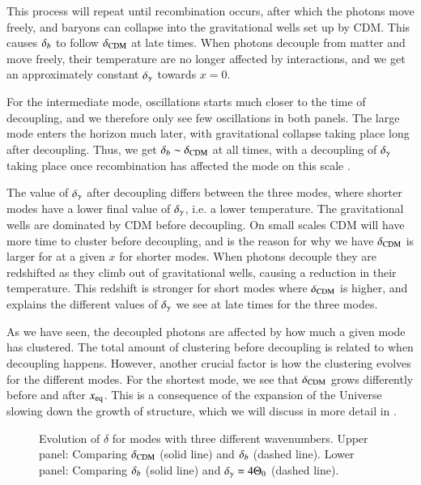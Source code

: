 This process will repeat until recombination occurs, after which the photons move freely, and baryons can collapse into the gravitational wells set up by CDM. This causes $\delta_b$ to follow $\delta_\mathrm{CDM}$ at late times. When photons decouple from matter and move freely, their temperature are no longer affected by interactions, and we get an approximately constant $\delta_\gamma$ towards $x=0$.  

For the intermediate mode, oscillations starts much closer to the time of decoupling, and we therefore only see few oscillations in both panels. The large mode enters the horizon much later, with gravitational collapse taking place long after decoupling. Thus, we get $\delta_b\sim\delta_\mathrm{CDM}$ at all times, with a decoupling of $\delta_\gamma$ taking place once recombination has affected the mode on this scale . 

The value of $\delta_\gamma$ after decoupling differs between the three modes, where shorter modes have a lower final value of $\delta_\gamma$, i.e. a lower temperature. The gravitational wells are dominated by CDM before decoupling. On small scales CDM will have more time to cluster before decoupling, and is the reason for why we have $\delta_\mathrm{CDM}$ is larger for at a given $x$ for shorter modes. When photons decouple they are redshifted as they climb out of gravitational wells, causing a reduction in their temperature. This redshift is stronger for short modes where $\delta_\mathrm{CDM}$ is higher, and explains the different values of $\delta_\gamma$ we see at late times for the three modes. 

As we have seen, the decoupled photons are affected by how much a given mode has clustered. The total amount of clustering before decoupling is related to when decoupling happens. However, another crucial factor is how the clustering evolves for the different modes. For the shortest mode, we see that $\delta_\mathrm{CDM}$ grows differently before and after $x_\mathrm{eq}$. This is a consequence of the expansion of the Universe slowing down the growth of structure, which we will discuss in more detail in .

\begin{figure}[ht!]
    \caption{Evolution of $\delta$ for modes with three different wavenumbers. Upper panel: Comparing $\delta_\mathrm{CDM}$ (solid line) and $\delta_b$ (dashed line). Lower panel: Comparing $\delta_b$ (solid line) and $\delta_\gamma=4\Theta_0$ (dashed line).}
    \label{fig:M3:results:deltas}
\end{figure}


